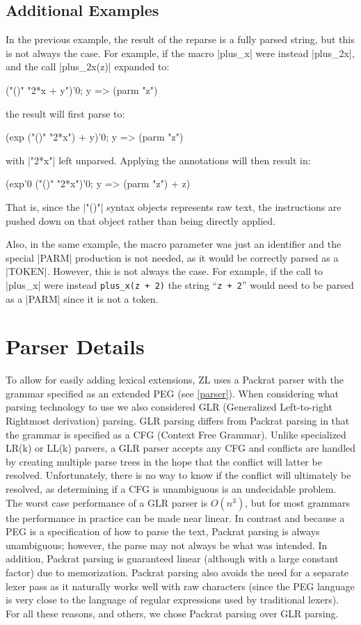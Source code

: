 \subsection{Additional Examples}

In the previous example, the result of the reparse is a
fully parsed string, but this is not always the case.  For example, if
the macro |plus_x| were instead |plus_2x|, and the call |plus_2x(z)|
expanded to:
\begin{code}
("()" "2*x + y"){'0; y => (parm "z")}
\end{code}
the result will first parse to:
\begin{code}
(exp ("()" "2*x") + y){'0; y => (parm "z")}
\end{code}
with |"2*x"| left unparsed.  Applying the annotations will then result
in:
\begin{code}
(exp'0 ("()" "2*x"){'0; y => (parm "z")} + z)
\end{code}
That is, since the |"()"| syntax objects represents raw text, the
instructions are pushed down on that object rather than being directly
applied.

Also, in the same example, the macro parameter was just an identifier
and the special |PARM| production is not needed, as it would be
correctly parsed as a |TOKEN|.  However, this is not always the case.
For example, if the call to |plus_x| were instead \verb/plus_x(z + 2)/ the
string ``\verb/z + 2/'' would need to be parsed as a |PARM| since it is not
a token.

\section{Parser Details}
\label{parser-details}

To allow for easily adding lexical extensions, ZL uses a Packrat
parser with the grammar specified as an extended PEG (see
\ref{parser}).  When considering what parsing technology to use we
also considered GLR (Generalized Left-to-right Rightmost derivation)
parsing.  GLR parsing differs from Packrat parsing in that the grammar
is specified as a CFG (Context Free Grammar).  Unlike specialized
LR(k) or LL(k) parsers, a GLR parser accepts any CFG and conflicts are
handled by creating multiple parse trees in the hope that the conflict
will latter be resolved.  Unfortunately, there is no way to know if
the conflict will ultimately be resolved, as determining if a CFG is
unambiguous is an undecidable problem.  The worst case performance of
a GLR parser is $O(n^3)$, but for most grammars the performance in
practice can be made near linear.  In contrast and because a PEG is a
specification of how to parse the text, Packrat parsing is always
unambiguous; however, the parse may not always be what was intended.
In addition, Packrat parsing is guaranteed linear
(although with a large constant factor) due to memorization.
Packrat parsing also avoids
the need for a separate lexer pass as it naturally works well with raw
characters (since the PEG language is very close to the language of
regular expressions used by traditional lexers).  For all these
reasons, and others, we chose Packrat parsing over GLR parsing.

